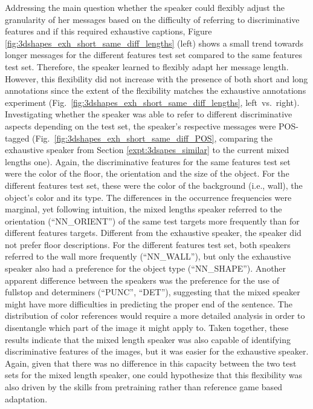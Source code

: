 Addressing the main question whether the speaker could flexibly adjust the granularity of her messages based on the difficulty of referring to discriminative features and if this required exhaustive captions, Figure \ref{fig:3dshapes_exh_short_same_diff_lengths} (left) shows a small trend towards longer messages for the different features test set compared to the same features test set. Therefore, the speaker learned to flexibly adapt her message length. However, this flexibility did not increase with the presence of both short and long annotations since the extent of the flexibility matches the exhaustive annotations experiment (Fig.~\ref{fig:3dshapes_exh_short_same_diff_lengths}, left~vs.~right). 
Investigating whether the speaker was able to refer to different discriminative aspects depending on the test set, the speaker's respective messages were POS-tagged (Fig.~\ref{fig:3dshapes_exh_short_same_diff_POS}, comparing the exhaustive speaker from Section \ref{expt:3dsapes_similar} to the current mixed lengths one). Again, the discriminative features for the same features test set were the color of the floor, the orientation and the size of the object. For the different features test set, these were the color of the background (i.e., wall), the object's color and its type. The differences in the occurrence frequencies were marginal, yet following intuition, %
the mixed lengths speaker referred to the orientation (``NN\_ORIENT'') of the same test targets more frequently than for different features targets. Different from the exhaustive speaker, the speaker did not prefer floor descriptions. 
For the different features test set, both speakers referred to the wall more frequently (``NN\_WALL''), but only the exhaustive speaker also had a preference for the object type (``NN\_SHAPE''). Another apparent difference between the speakers was the preference for the use of fullstop and determiners (``PUNC'', ``DET''), suggesting that the mixed speaker might have more difficulties in predicting the proper end of the sentence.
The distribution of color references would require a more detailed analysis in order to disentangle which part of the image it might apply to. Taken together, these results indicate that the mixed length speaker was also capable of identifying discriminative features of the images, but it was easier for the exhaustive speaker. Again, given that there was no difference in this capacity between the two test sets for the mixed length speaker, one could hypothesize that this flexibility was also driven by the skills from pretraining rather than reference game based adaptation. 
